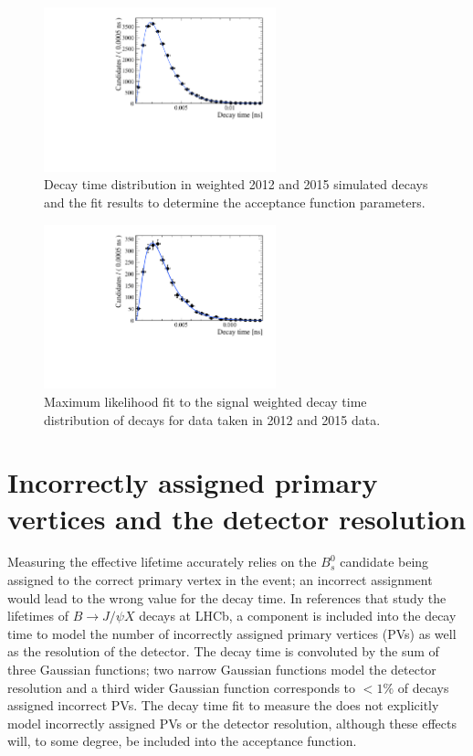 \begin{figure}[tbp]
\centering
  \includegraphics[width=0.6\textwidth]{./Figs/LifetimeSystematics/Bs2KK_acceptance_Fit.pdf}
\caption{Decay time distribution in weighted 2012 and 2015 simulated decays and the fit  results to determine the acceptance function parameters. }
\label{fig:bskkacceptancefit}
\end{figure}

\begin{figure}[tbp]
\centering
  \includegraphics[width=0.6\textwidth]{./Figs/LifetimeSystematics/Bd2KPi_lifetime_fit.pdf}
\caption{Maximum likelihood fit to the signal weighted decay time distribution of \bskk decays for data taken in 2012 and 2015 data. }
\label{fig:bskklifetimefit}
\end{figure}

\section{Incorrectly assigned primary vertices and the detector resolution}
\label{sec:PVcheck}
Measuring the \bsmumu effective lifetime accurately relies on the $B^{0}_{s}$ candidate being assigned to the correct primary vertex in the event; an incorrect assignment would lead to the wrong value for the \bs decay time. %
In references \cite{Aaij:2016ohx,Aaij:2015vza} that study the lifetimes of $B \to J/\psi X$ decays at LHCb, a component is included into the decay time \pdf to model the number of incorrectly assigned primary vertices (PVs) as well as the resolution of the detector. The decay time \pdf is convoluted by the sum of three Gaussian functions; two narrow Gaussian functions model the detector resolution  and a third wider Gaussian function corresponds to $<1\%$ of decays assigned incorrect PVs. The decay time fit to measure the \bsmumu \el does not explicitly model incorrectly assigned PVs or the detector resolution, although these effects will, to some degree, be included into the acceptance function. 

